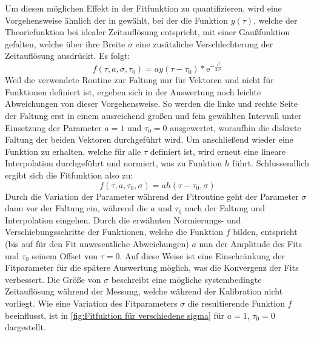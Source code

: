 Um diesen möglichen Effekt in der Fitfunktion zu quantifizieren, wird eine Vorgehensweise ähnlich der in \cite{lasseguesFieldIntensityCorrelations2022} gewählt, bei der die Funktion $y(\tau)$, welche der Theoriefunktion bei idealer Zeitauflösung entspricht, mit einer Gaußfunktion gefalten, welche über ihre Breite $\sigma$ eine zusätzliche Verschlechterung der Zeitauflösung ausdrückt. 
Es folgt:
\begin{equation}
    f(\tau, a, \sigma, \tau_0) = ay(\tau - \tau_0) * \mathrm{e}^{-\frac{\tau^2}{2\sigma^2}}
\end{equation}
Weil die verwendete Routine zur Faltung nur für Vektoren und nicht für Funktionen definiert ist, ergeben sich in der Auswertung noch leichte Abweichungen von dieser Vorgehensweise. 
So werden die linke und rechte Seite der Faltung erst in einem ausreichend großen und fein gewählten Intervall unter Einsetzung der Parameter $a=1$ und $\tau_0 = 0$ ausgewertet, woraufhin die diskrete Faltung der beiden Vektoren durchgeführt wird. 
Um anschließend wieder eine Funktion zu erhalten, welche für alle $\tau$ definiert ist, wird erneut eine lineare Interpolation durchgeführt und normiert, was zu Funktion $h$ führt. 
Schlussendlich ergibt sich die Fitfunktion also zu:
\begin{equation}
    f(\tau, a, \tau_0, \sigma) = ah(\tau- \tau_0, \sigma)
    \label{eq:fit funktion final}
\end{equation} 
Durch die Variation der Parameter während der Fitroutine geht der Parameter $\sigma$ dann vor der Faltung ein, während die $a$ und $\tau_0$ nach der Faltung und Interpolation eingehen. 
Durch die erwähnten Normierungs- und Verschiebungsschritte der Funktionen, welche die Funktion $f$ bilden, entspricht (bis auf für den Fit unwesentliche Abweichungen) $a$ nun der Amplitude des Fits und $\tau_0$ seinem Offset von $\tau=0$. 
Auf diese Weise ist eine Einschränkung der Fitparameter für die spätere Auswertung möglich, was die Konvergenz der Fits verbessert. 
Die Größe von $\sigma$ beschreibt eine mögliche systembedingte Zeitauflösung während der Messung, welche während der Kalibration nicht vorliegt. 
Wie eine Variation des Fitparameters $\sigma$ die resultierende Funktion $f$ beeinflusst, ist in \autoref{fig:Fitfuktion für verschiedene sigma} für $a=1$, $\tau_0=0$ dargestellt. 
